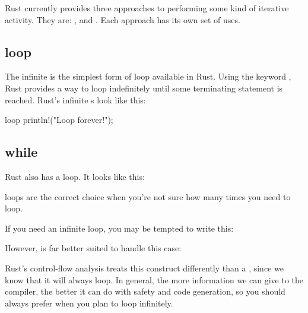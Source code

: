 Rust currently provides three approaches to performing some kind of iterative activity. They are: ,  and 
. Each approach has its own set of uses.

\subsection*{loop}

The infinite  is the simplest form of loop available in Rust. Using the keyword , Rust provides a way to 
loop indefinitely until some terminating statement is reached. Rust's infinite s look like this:

\begin{rustc}
loop {
    println!("Loop forever!");
}
\end{rustc}

\subsection*{while}

Rust also has a  loop. It looks like this:


 loops are the correct choice when you're not sure how many times you need to loop.

\blank

If you need an infinite loop, you may be tempted to write this:

\begin{rustc}
while true {
\end{rustc}

However,  is far better suited to handle this case:

\begin{rustc}
loop {
\end{rustc}

Rust's control-flow analysis treats this construct differently than a , since we know that it will always loop. 
In general, the more information we can give to the compiler, the better it can do with safety and code generation, so you should 
always prefer  when you plan to loop infinitely.


